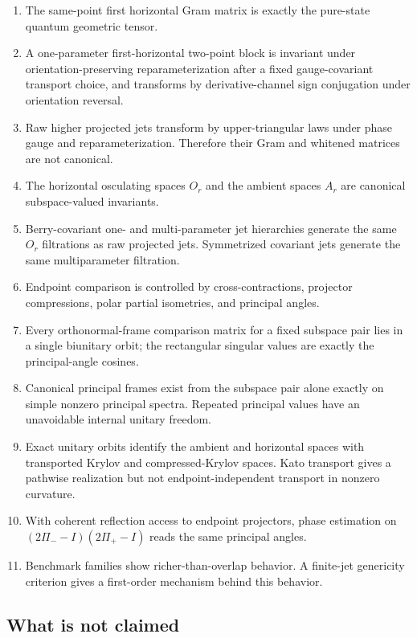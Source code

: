 \documentclass[11pt]{amsart}
\newcommand{\Id}{I}
\newcommand{\Proj}{\Pi}
\begin{document}
\begin{enumerate}
\item The same-point first horizontal Gram matrix is exactly the pure-state
quantum geometric tensor.
\item A one-parameter first-horizontal two-point block is invariant under
orientation-preserving reparameterization after a fixed gauge-covariant
transport choice, and transforms by derivative-channel sign conjugation under
orientation reversal.
\item Raw higher projected jets transform by upper-triangular laws under phase
gauge and reparameterization. Therefore their Gram and whitened matrices are
not canonical.
\item The horizontal osculating spaces \(O_r\) and the ambient spaces \(A_r\)
are canonical subspace-valued invariants.
\item Berry-covariant one- and multi-parameter jet hierarchies generate the
same \(O_r\) filtrations as raw projected jets. Symmetrized covariant jets
generate the same multiparameter filtration.
\item Endpoint comparison is controlled by cross-contractions, projector
compressions, polar partial isometries, and principal angles.
\item Every orthonormal-frame comparison matrix for a fixed subspace pair lies
in a single biunitary orbit; the rectangular singular values are exactly the
principal-angle cosines.
\item Canonical principal frames exist from the subspace pair alone exactly on
simple nonzero principal spectra. Repeated principal values have an unavoidable
internal unitary freedom.
\item Exact unitary orbits identify the ambient and horizontal spaces with
transported Krylov and compressed-Krylov spaces. Kato transport gives a
pathwise realization but not endpoint-independent transport in nonzero
curvature.
\item With coherent reflection access to endpoint projectors, phase estimation
on \((2\Proj_- - \Id)(2\Proj_+ - \Id)\) reads the same principal angles.
\item Benchmark families show richer-than-overlap behavior. A finite-jet
genericity criterion gives a first-order mechanism behind this behavior.
\end{enumerate}

\subsection{What is not claimed}
\end{document}
